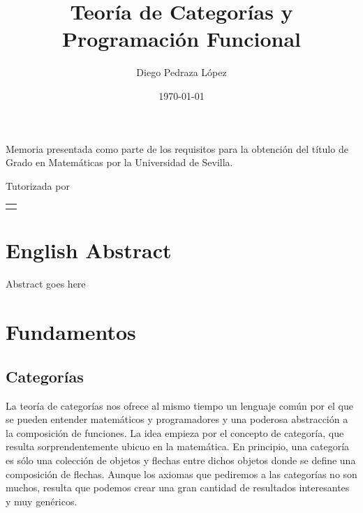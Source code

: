 \documentclass[12pt, twoside]{book}
\title{Teoría de Categorías y Programación Funcional}
\author{Diego Pedraza López}
\date{\today}
\makeatletter
\renewcommand\maketitle{%
  \begin{titlepage}
      \vspace*{1.5cm}
      \parskip=0pt
      \Huge\bfseries
      \begin{center}
          \@title
      \end{center}
      \vspace{1cm}
      \begin{center}
          \@author
      \end{center}
  \end{titlepage}

  \begin{titlepage}
  \parindent=0pt
  \begin{flushleft}
  \vspace*{1.5mm}
  \setlength\baselineskip{0pt}
  \setlength\parskip{0mm}
  \begin{center}
  \end{center}
  \end{flushleft}
  \vspace{1cm}
  \bgroup
  \Large \bfseries
  \begin{center}
  \@title
  \end{center}
  \egroup
  \vspace*{.5cm}
  \begin{center}
  \@author
  \end{center}
  \vspace*{1.8cm}
  \begin{flushright}
  \begin{minipage}{8.45cm}
      Memoria presentada como parte de los requisitos para la obtención del título de
      Grado en Matemáticas por la Universidad de Sevilla.

      \vspace*{7.5mm}

      Tutorizada por
  \end{minipage}\par
  \begin{tabularx}{8.45cm}[b]{@{}l}
      \guardatutores
  \end{tabularx}
   \end{flushright}
      \vspace*{\fill}
   \end{titlepage}
   \pagestyle{tfg}
   \renewcommand{\chaptermark}[1]{\markright{\thechapter.\space ##1}}
   \renewcommand{\sectionmark}[1]{}
   \renewcommand{\subsectionmark}[1]{}
  }
\makeatother
\begin{document}
\maketitle

\frontmatter
\tableofcontents

\mainmatter


\chapter*{English Abstract}

\begin{otherlanguage}{english}
    Abstract goes here
\end{otherlanguage}

\chapter{Fundamentos}

\section{Categorías}

La teoría de categorías nos ofrece al mismo tiempo un lenguaje común por el que se pueden entender matemáticos y programadores y una poderosa abstracción a la composición de funciones.
La idea empieza por el concepto de categoría, que resulta sorprendentemente ubicuo en la matemática.
En principio, una categoría es sólo una colección de objetos y flechas entre dichos objetos donde se define una composición de flechas.
Aunque los axiomas que pediremos a las categorías no son muchos, resulta que podemos crear una gran cantidad de resultados interesantes y muy genéricos.
\end{document}
